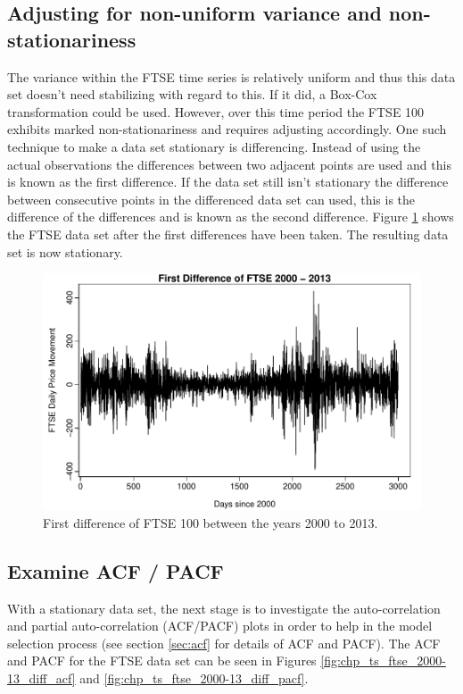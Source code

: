 \subsection{Adjusting for non-uniform variance and non-stationariness}
The variance within the FTSE time series is relatively uniform and thus this data set doesn't need stabilizing with regard to this. If it did, a Box-Cox transformation could be used. However, over this time period the FTSE 100 exhibits marked non-stationariness and requires adjusting accordingly. One such technique to make a data set stationary is differencing. Instead of using the actual observations the differences between two adjacent points are used and this is known as the first difference. If the data set still isn't stationary the difference between consecutive points in the differenced data set can used, this is the difference of the differences and is known as the second difference. Figure \ref{fig:chp_ts_ftse_2000_13_diff} shows the FTSE data set after the first differences have been taken.  The resulting data set is now stationary.

\begin{figure}[tbh]
\centering
\includegraphics{Figures/chp_ts_ftse_2000-13_diff}
\caption[First difference of FTSE 100 between the years 2000 to 2013]{First difference of FTSE 100 between the years 2000 to 2013.}
\label{fig:chp_ts_ftse_2000_13_diff}
\end{figure}

\subsection{Examine ACF / PACF}
With a stationary data set, the next stage is to investigate the auto-correlation and partial auto-correlation (ACF/PACF) plots in order to help in the model selection process (see section \ref{sec:acf} for details of ACF and PACF). The ACF and PACF for the FTSE data set can be seen in Figures \ref{fig:chp_ts_ftse_2000-13_diff_acf} and \ref{fig:chp_ts_ftse_2000-13_diff_pacf}. 

